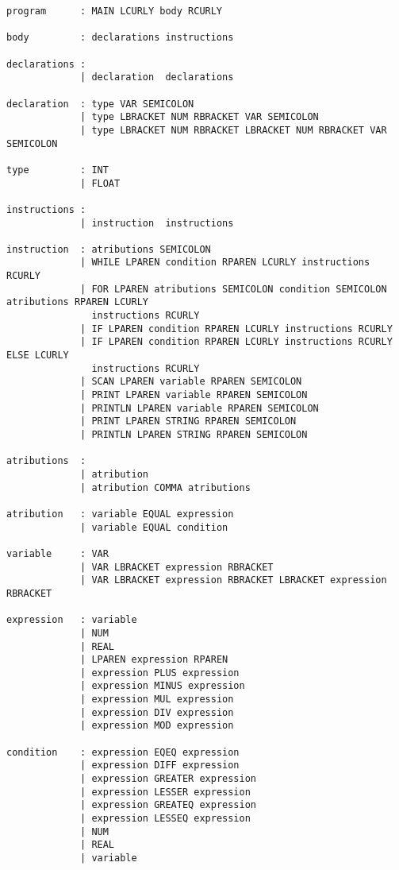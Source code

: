 \documentclass[11pt,a4paper]{report}%
\begin{document}
\begin{verbatim}
program      : MAIN LCURLY body RCURLY

body         : declarations instructions

declarations : 
             | declaration  declarations

declaration  : type VAR SEMICOLON
             | type LBRACKET NUM RBRACKET VAR SEMICOLON
             | type LBRACKET NUM RBRACKET LBRACKET NUM RBRACKET VAR SEMICOLON

type         : INT
             | FLOAT

instructions :
             | instruction  instructions

instruction  : atributions SEMICOLON
             | WHILE LPAREN condition RPAREN LCURLY instructions RCURLY
             | FOR LPAREN atributions SEMICOLON condition SEMICOLON atributions RPAREN LCURLY 
               instructions RCURLY
             | IF LPAREN condition RPAREN LCURLY instructions RCURLY
             | IF LPAREN condition RPAREN LCURLY instructions RCURLY ELSE LCURLY 
               instructions RCURLY
             | SCAN LPAREN variable RPAREN SEMICOLON
             | PRINT LPAREN variable RPAREN SEMICOLON
             | PRINTLN LPAREN variable RPAREN SEMICOLON
             | PRINT LPAREN STRING RPAREN SEMICOLON
             | PRINTLN LPAREN STRING RPAREN SEMICOLON

atributions  : 
             | atribution
             | atribution COMMA atributions

atribution   : variable EQUAL expression 
             | variable EQUAL condition

variable     : VAR
             | VAR LBRACKET expression RBRACKET
             | VAR LBRACKET expression RBRACKET LBRACKET expression RBRACKET

expression   : variable
             | NUM
             | REAL
             | LPAREN expression RPAREN
             | expression PLUS expression
             | expression MINUS expression
             | expression MUL expression
             | expression DIV expression
             | expression MOD expression

condition    : expression EQEQ expression
             | expression DIFF expression
             | expression GREATER expression
             | expression LESSER expression
             | expression GREATEQ expression
             | expression LESSEQ expression
             | NUM
             | REAL
             | variable
\end{verbatim}
\end{document}

